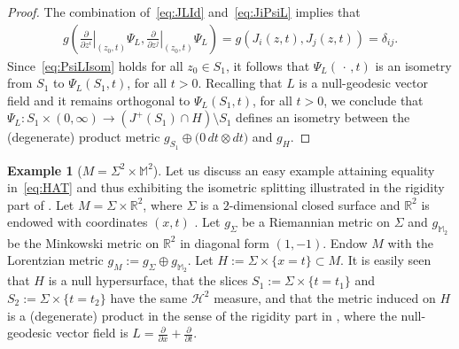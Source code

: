 \documentclass[12pt,a4paper]{amsart}
\theoremstyle{plain}
\theoremstyle{definition}
\newtheorem{example}[lemma]{Example}
\numberwithin{equation}{section}
\newcommand{\R}{\mathbb{R}}
\newcommand{\dotargument}{\,\cdot\,}
\begin{document}
\begin{proof}
The combination of~\eqref{eq:JLId} and~\eqref{eq:JiPsiL} implies that
\begin{align}\label{eq:PsiLIsom}
g\left( \left. \frac{\partial}{\partial z^i} \right|_{(z_0,t)} \Psi_L, \left. \frac{\partial}{\partial z^j} \right|_{(z_0,t)} \Psi_L \right)=g\left(J_i(z,t), J_j(z,t)\right)=  \delta_{ij}.
\end{align}
Since~\eqref{eq:PsiLIsom} holds for all $z_0\in S_1$, 
it follows that $\Psi_L(\dotargument, t)$ is an isometry from $S_1$ to $\Psi_L(S_1,t)$, for all $t>0$. Recalling that $L$ is a null-geodesic vector field and it remains orthogonal to $\Psi_L(S_1,t)$, for all $t>0$, we conclude that  $\Psi_L:S_1\times (0,\infty)\to (J^+(S_1)\cap H)\setminus S_1$ defines an isometry between the (degenerate) product  metric $g_{S_1}\oplus \big( 0 \, dt\otimes dt \big)$ and $g_H$.
\end{proof}


\begin{example} [$M=\Sigma^2\times \mathbb{M}^2$]
Let us discuss an easy example attaining equality in~\eqref{eq:HAT} and thus exhibiting the isometric splitting illustrated in the rigidity part of .
Let $M=\Sigma\times \R^2$, where $\Sigma$ is a $2$-dimensional closed surface and $\R^2$ is endowed with coordinates $(x,t)$ . Let $g_{\Sigma}$ be a Riemannian metric on $\Sigma$ and  $g_{\mathbb M_2}$ be the Minkowski metric on $\R^2$ in diagonal form $(1,-1)$. Endow $M$ with the Lorentzian metric
$ g_M:= g_{\Sigma}\oplus g_{\mathbb M_2}$.
Let $H:=\Sigma\times\{x=t\}\subset M$. It is easily seen that $H$ is a null hypersurface, that the slices $S_1:=\Sigma\times \{t=t_1\}$ and  $S_2:=\Sigma \times \{t=t_2\}$ have the same $\mathcal{H}^2$ measure, and that the metric induced on $H$ is a (degenerate) product in the sense of the rigidity part in , where the null-geodesic vector field is $L=\frac{\partial}{\partial x}+\frac{\partial}{\partial t}$.
\end{example}
\end{document}
